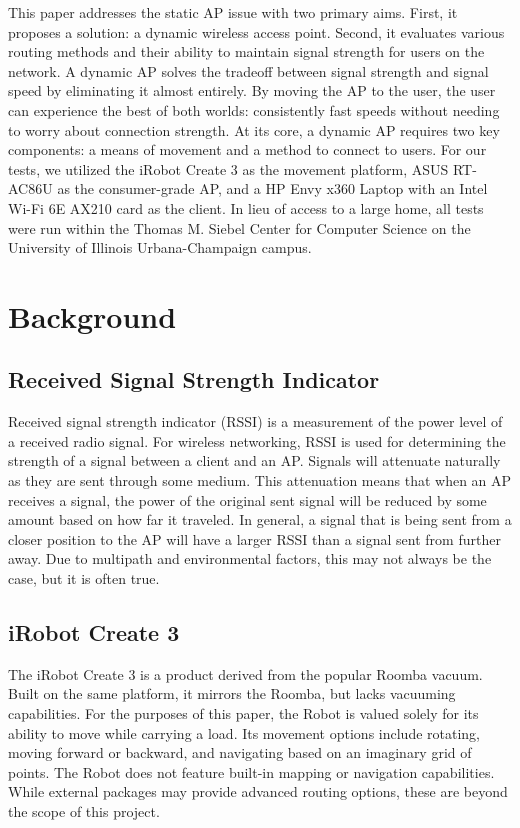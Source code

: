   

This paper addresses the static AP issue with two primary aims. First, it proposes a solution: a dynamic wireless access point. Second, it evaluates various routing methods and their ability to maintain signal strength for users on the network. A dynamic AP solves the tradeoff between signal strength and signal speed by eliminating it almost entirely. By moving the AP to the user, the user can experience the best of both worlds: consistently fast speeds without needing to worry about connection strength. At its core, a dynamic AP requires two key components: a means of movement and a method to connect to users. For our tests, we utilized the iRobot Create 3 as the movement platform, ASUS RT-AC86U as the consumer-grade AP, and a HP Envy x360 Laptop with an Intel Wi-Fi 6E AX210 card as the client. In lieu of access to a large home, all tests were run within the Thomas M. Siebel Center for Computer Science on the University of Illinois Urbana-Champaign campus.

  

\section{Background}

\subsection{Received Signal Strength Indicator}

Received signal strength indicator (RSSI) is a measurement of the power level of a received radio signal. For wireless networking, RSSI is used for determining the strength of a signal between a client and an AP. Signals will attenuate naturally as they are sent through some medium. This attenuation means that when an AP receives a signal, the power of the original sent signal will be reduced by some amount based on how far it traveled. In general, a signal that is being sent from a closer position to the AP will have a larger RSSI than a signal sent from further away. Due to multipath and environmental factors, this may not always be the case, but it is often true.

  

\subsection{iRobot Create 3}

The iRobot Create 3 is a product derived from the popular Roomba vacuum. Built on the same platform, it mirrors the Roomba, but lacks vacuuming capabilities. For the purposes of this paper, the Robot is valued solely for its ability to move while carrying a load. Its movement options include rotating, moving forward or backward, and navigating based on an imaginary grid of points. The Robot does not feature built-in mapping or navigation capabilities. While external packages may provide advanced routing options, these are beyond the scope of this project.

